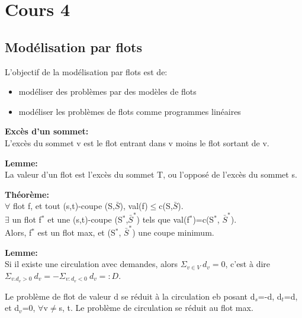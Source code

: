 \section{Cours 4}
\subsection{Modélisation par flots}
L'objectif de la modélisation par flots est de:
\begin{itemize}
	\item modéliser des problèmes par des modèles de flots
	\item modéliser les problèmes de flots comme programmes linéaires
\end{itemize}

\textbf{Excès d'un sommet:\\}
L'excès du sommet v est le flot entrant dans v moins le flot sortant de v.

\textbf{Lemme:\\}
La valeur d'un flot est l'excès du sommet T, ou l'opposé de l'excès du sommet s.

\textbf{Théorème:\\}
$\forall$ flot f, et tout (s,t)-coupe (S,$\bar{S}$), val(f)$\leq$c(S,$\bar{S}$).\\
$\exists$ un flot f$^*$ et une (s,t)-coupe (S$^*$,$\bar{S}^*$) tels que val(f$^*$)=c(S$^*$, $\bar{S}^*$).\\
Alors, f$^*$ est un flot max, et (S$^*$, $\bar{S}^*$) une coupe minimum.

\textbf{Lemme:\\}
Si il existe une circulation avec demandes, alors $\Sigma_{v \in V}~d_v=0$, c'est à dire
$\Sigma_{v.d_v>0}~d_v=-\Sigma_{v:d_v<0}~d_v=:D$.

Le problème de flot de valeur d se réduit à la circulation eb posant d$_s$=-d, d$_t$=d, et d$_v$=0,
$\forall$v$\neq$s, t.
Le problème de circulation se réduit au flot max.

